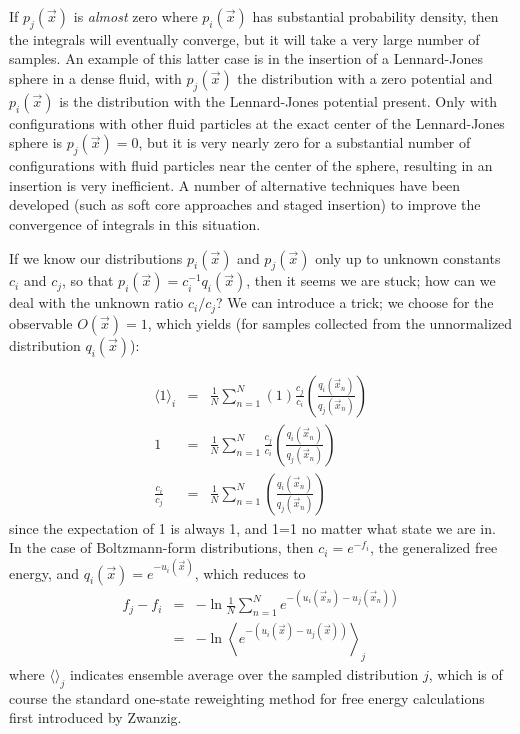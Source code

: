 \documentclass[aps,pre,twocolumn,superscriptaddress]{revtex4-1}
\newcommand{\expect}[1]{\left \langle #1 \right \rangle} %
\begin{document}
If $p_j(\vec{x})$ is {\em almost} zero where
$p_i(\vec{x})$ has substantial probability density, then the integrals
will eventually converge, but it will take a very large number of
samples. An example of this latter case is in the insertion of a
Lennard-Jones sphere in a dense fluid, with $p_j(\vec{x})$ the
distribution with a zero potential and $p_i(\vec{x})$ is the
distribution with the Lennard-Jones potential present.  Only with
configurations with other fluid particles at the exact center of the
Lennard-Jones sphere is $p_j(\vec{x})=0$, but it is very nearly zero
for a substantial number of configurations with fluid particles near
the center of the sphere, resulting in an insertion is very
inefficient.  A number of alternative techniques have been developed
(such as soft core approaches and staged insertion) to improve the
convergence of integrals in this situation.


If we know our distributions $p_i(\vec{x})$ and $p_j(\vec{x})$ only up
to unknown constants $c_i$ and $c_j$, so that $p_i(\vec{x}) =
c_i^{-1}q_i(\vec{x})$, then it seems we are stuck; how can we deal
with the unknown ratio $c_i/c_j$? We can introduce a trick; we choose
for the observable $O(\vec{x})=1$, which yields (for samples collected
from the unnormalized distribution $q_i(\vec{x})$):

\begin{eqnarray}
\langle 1 \rangle_{i} &=& \frac{1}{N} \sum_{n=1}^{N} \left(1\right) \frac{c_j}{c_i} \left(\frac{q_i(\vec{x}_n)}{q_j(\vec{x}_n)}\right) \nonumber \\
        1  &=& \frac{1}{N} \sum_{n=1}^{N}\frac{c_j}{c_i} \left(\frac{q_i(\vec{x}_n)}{q_j(\vec{x}_n)}\right) \nonumber \\
       \frac{c_i}{c_j}  &=& \frac{1}{N} \sum_{n=1}^{N} \left(\frac{q_i(\vec{x}_n)}{q_j(\vec{x}_n)}\right)
\end{eqnarray}
since the expectation of 1 is always 1, and 1=1 no matter what state
we are in. In the case of Boltzmann-form distributions, then $c_i =
e^{-f_i}$, the generalized free energy, and $q_i(\vec{x}) =
e^{-u_i(\vec{x})}$, which reduces to
\begin{eqnarray}
f_j-f_i  &=& -\ln \frac{1}{N} \sum_{n=1}^N e^{-(u_i(\vec{x}_n)-u_j(\vec{x}_n))}  \nonumber \\
            &=& -\ln \expect{ e^{-(u_i(\vec{x})-u_j(\vec{x}))}}_{j}
\end{eqnarray}
where $\langle \rangle_j$ indicates ensemble average over the sampled distribution $j$, which is of course the standard one-state reweighting method for free
energy calculations first introduced by Zwanzig.
\end{document}
